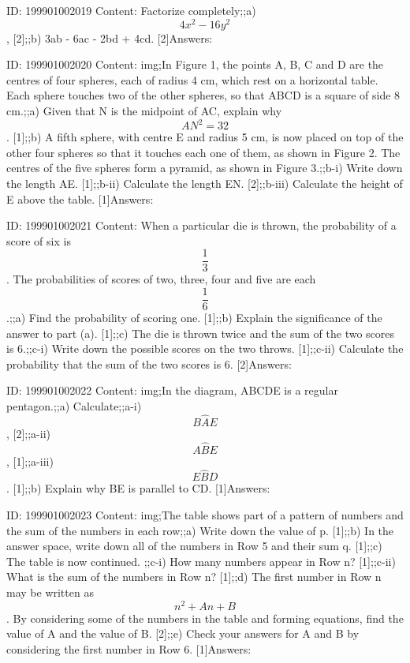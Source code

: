 \documentclass{article}
\begin{document}
ID: 199901002019
Content:
Factorize completely;;a) $$4x^{2} -16y^{2} $$, [2];;b) 3ab - 6ac - 2bd + 4cd. [2]Answers:

ID: 199901002020
Content:
img;In Figure 1, the points A, B, C and D are the centres of four spheres, each of radius 4 cm, which rest on a horizontal table. Each sphere touches two of the other spheres, so that ABCD is a square of side 8 cm.;;a) Given that N is the midpoint of AC, explain why $$AN^{2} =32$$. [1];;b) A fifth sphere, with centre E and radius 5 cm, is now placed on top of the other four spheres so that it touches each one of them, as shown in Figure 2. The centres of the five spheres form a pyramid, as shown in Figure 3.;;b-i) Write down the length AE. [1];;b-ii) Calculate the length EN. [2];;b-iii) Calculate the height of E above the table. [1]Answers:

ID: 199901002021
Content:
When a particular die is thrown, the probability of a score of six is $$\frac{1}{3}$$. The probabilities of scores of two, three, four and five are each $$\frac{1}{6}$$.;;a) Find the probability of scoring one. [1];;b) Explain the significance of the answer to part (a). [1];;c) The die is thrown twice and the sum of the two scores is 6.;;c-i) Write down the possible scores on the two throws. [1];;c-ii) Calculate the probability that the sum of the two scores is 6. [2]Answers:

ID: 199901002022
Content:
img;In the diagram, ABCDE is a regular pentagon.;;a) Calculate;;a-i) $$B \hat AE$$, [2];;a-ii) $$A \hat BE$$, [1];;a-iii) $$E \hat BD$$. [1];;b) Explain why BE is parallel to CD. [1]Answers:

ID: 199901002023
Content:
img;The table shows part of a pattern of numbers and the sum of the numbers in each row;;a) Write down the value of p. [1];;b) In the answer space, write down all of the numbers in Row 5 and their sum q. [1];;c) The table is now continued. ;;c-i) How many numbers appear in Row n? [1];;c-ii) What is the sum of the numbers in Row n? [1];;d) The first number in Row n may be written as $$n^{2} +An+B$$. By considering some of the numbers in the table and forming equations, find the value of A and the value of B. [2];;e) Check your answers for A and B by considering the first number in Row 6. [1]Answers:
\end{document}

